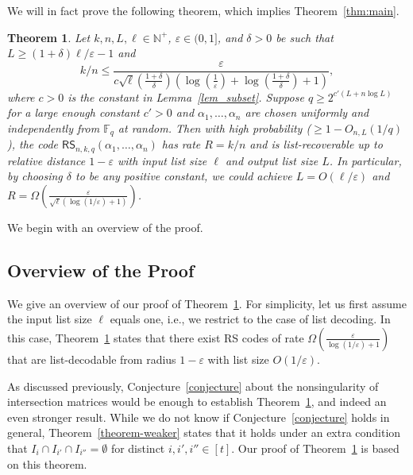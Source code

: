 \documentclass[11pt]{article}
\newtheorem{theorem}{Theorem}[section]
\newcommand\black[1]{{\color{black} #1}}
\renewcommand{\epsilon}{\varepsilon}
\newcommand{\N}{{\mathbb{N}}}
\begin{document}
We will in fact prove the following theorem, which implies Theorem~\ref{thm:main}.
\begin{theorem} \label{list-recover-main}
Let $k,n, L, \ell\in\N^+$, $\epsilon\in (0,1]$, and $\delta>0$ be such that  $L\geq (1+\delta)\ell/\epsilon-1$  and
\[
k/n\leq \frac{\epsilon}{c \sqrt{\ell}( \frac{1+\delta}{\delta } )(\log(\frac{1}{\epsilon})+\log( \frac{1+\delta}{\delta })+1)},
\]
where $c>0$ is the constant in Lemma~\ref{lem_subset}.
Suppose $q\geq 2^{c'(L+n\log L)}$ for a large enough constant $c'>0$ and $\alpha_1,\dots,\alpha_n$ are chosen uniformly and independently from $\mathbb{F}_q$ at random.
Then with high probability \black{($\ge 1-O_{n,L}(1/q)$)}, the code $\mathsf{RS}_{n,k,q}(\alpha_1,\dots,\alpha_n)$ has rate $R=k/n$ and is list-recoverable up to relative distance $1-\epsilon$ with input list size $\ell$ and output list size $L$.
In particular, by choosing $\delta$ to be any positive constant, we could achieve $L=O(\ell/\epsilon)$ and $R=\Omega\left(\frac{\epsilon}{\sqrt{\ell}(\log(1/\epsilon)+1)}\right)$.
\end{theorem}

We begin with an overview of the proof.

\subsection{Overview of the Proof}
\label{sec:overview}

We give an overview of our proof of Theorem~\ref{list-recover-main}.
For simplicity, let us first assume the input list size $\ell$ equals one, i.e., we restrict to the case of list decoding.
In this case, Theorem~\ref{list-recover-main} states that there exist RS codes of rate $\Omega(\frac{\epsilon}{\log(1/\epsilon)+1})$ that are list-decodable from radius $1-\epsilon$ with list size $O(1/\epsilon)$.


As discussed previously, Conjecture~\ref{conjecture} about the nonsingularity of intersection matrices would be enough to establish Theorem~\ref{list-recover-main}, and indeed an even stronger result.
While we do not know if Conjecture~\ref{conjecture} holds in general,  Theorem~\ref{theorem-weaker} states that it holds under an extra condition that $I_i\cap I_{i'}\cap I_{i''}=\emptyset$ for distinct $i,i',i''\in[t]$. Our proof of Theorem~\ref{list-recover-main} is based on this theorem.
\end{document}
